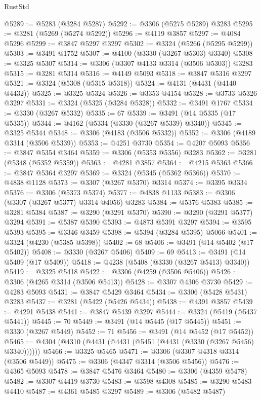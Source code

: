 \begin{lexlean}{RustStd}
\begin{coremodule}
@5289 := @5283 (@3284 @5287)
@5292 := @3306 (@5275 @5289) @3283
@5295 := @3281 (@5269 (@5274 @5292))
@5296 := @4119 @3857
@5297 := @4084 @5296
@5299 := @3847 @5297 @3297
@5302 := @3324 (@5266 (@5295 @5299))
@5303 := @3491 @1752
@5307 := @4100 (@3330 (@3267 @5303) @3340)
@5308 := @3325 @5307
@5314 := @3306 (@3307 @4133 @3314 (@3506 @5303)) @3283
@5315 := @3281 @5314
@5316 := @4149 @5093
@5318 := @3847 @5316 @3297
@5321 := @3324 (@5308 (@5315 @5318))
@5324 := @4131 (@4431 (@4140 @4432))
@5325 := @3325 @5324
@5326 := @3353 @4154
@5328 := @3733 @5326 @3297
@5331 := @3324 (@5325 (@3284 @5328))
@5332 := @3491 @1767
@5334 := @3330 (@3267 @5332)
@5335 := 67
@5339 := @3491 (@14 @5335 (@17 @5335))
@5344 := @4162 (@5334 (@3330 (@3267 @5339) @3340))
@5345 := @3325 @5344
@5348 := @3306 (@4183 (@3506 @5332))
@5352 := @3306 (@4189 @3314 (@3506 @5339))
@5353 := @4251 @3730
@5354 := @4207 @5093
@5356 := @3847 @5354 @3464
@5359 := @3306 (@5353 @5356) @3283
@5362 := @3281 (@5348 (@5352 @5359))
@5363 := @4281 @3857
@5364 := @4215 @5363
@5366 := @3847 @5364 @3297
@5369 := @3324 (@5345 (@5362 @5366))
@5370 := @4838 @1128
@5373 := @3307 (@3267 @5370) @3314
@5374 := @3395 @3334
@5376 := @3306 (@5373 @5374)
@5377 := @4838 @1133
@5383 := @3306 (@3307 (@3267 @5377) @3314 @4056) @3283
@5384 := @5376 @5383
@5385 := @3281 @5384
@5387 := @3290 (@3291 @5370)
@5390 := @3290 (@3291 @5377) @3294
@5391 := @5387 @5390
@5393 := @4873 @5391 @3297
@5394 := @3595 @5393
@5395 := @3346 @3459
@5398 := @5394 (@3284 @5395) @5066
@5401 := @3324 (@4230 (@5385 @5398))
@5402 := 68
@5406 := @3491 (@14 @5402 (@17 @5402))
@5408 := @3330 (@3267 @5406)
@5409 := 69
@5413 := @3491 (@14 @5409 (@17 @5409))
@5418 := @4238 (@5408 (@3330 (@3267 @5413) @3340))
@5419 := @3325 @5418
@5422 := @3306 (@4259 (@3506 @5406))
@5426 := @3306 (@4265 @3314 (@3506 @5413))
@5428 := @3307 @4306 @3730
@5429 := @4283 @5093
@5431 := @3847 @5429 @3464
@5434 := @3306 (@5428 @5431) @3283
@5437 := @3281 (@5422 (@5426 @5434))
@5438 := @4391 @3857
@5439 := @4291 @5438
@5441 := @3847 @5439 @3297
@5444 := @3324 (@5419 (@5437 @5441))
@5445 := 70
@5449 := @3491 (@14 @5445 (@17 @5445))
@5451 := @3330 (@3267 @5449)
@5452 := 71
@5456 := @3491 (@14 @5452 (@17 @5452))
@5465 := @4304 (@4310 (@4431 (@4431 (@5451 (@4431 (@3330 (@3267 @5456) @3340))))))
@5466 := @3325 @5465
@5471 := @3306 (@3307 @4318 @3314 (@3506 @5449))
@5475 := @3306 (@4347 @3314 (@3506 @5456))
@5476 := @4365 @5093
@5478 := @3847 @5476 @3464
@5480 := @3306 (@4359 @5478)
@5482 := @3307 @4419 @3730
@5483 := @3598 @4308
@5485 := @3290 @5483 @4410
@5487 := @4361 @5485 @3297
@5489 := @3306 (@5482 @5487)

\end{coremodule}
\end{lexlean}
